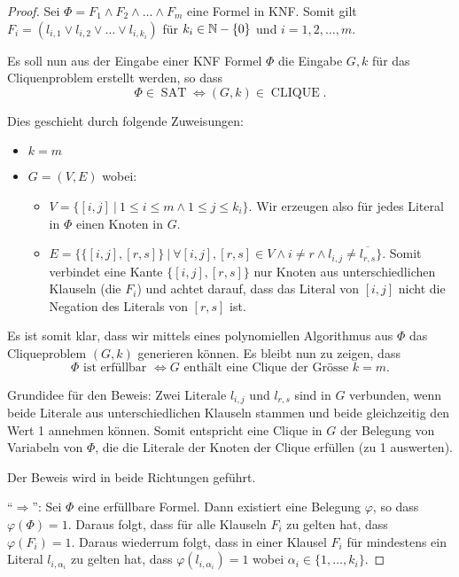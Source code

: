 \begin{proof}
Sei \(\Phi = F_1 \land F_2 \land \ldots \land F_m\) eine Formel in KNF. Somit gilt \(F_i = (l_{i, 1} \lor l_{i, 2} \lor \ldots \lor l_{i, k_i}) \) für \(k_i \in \mathbb{N} - \{0\}\) und \(i = 1, 2, \ldots, m\).

Es soll nun aus der Eingabe einer KNF Formel \(\Phi\) die Eingabe \(G, k\) für das Cliquenproblem erstellt werden, so dass
\[
\Phi \in \operatorname{SAT} \Leftrightarrow (G, k) \in \operatorname{CLIQUE}.
\]

Dies geschieht durch folgende Zuweisungen:
\begin{itemize}
  \item \(k = m\)
  \item \(G = (V, E)\) wobei:
  \begin{itemize}
    \item \(V = \{[i, j]\ |\ 1 \leq i \leq m \land 1 \leq j \leq k_i\}\). Wir erzeugen also für jedes Literal in \(\Phi\) einen Knoten in \(G\).
    \item \(E = \{ \{ [i, j], [r, s] \}\ |\ \forall [i,j], [r,s] \in V \land i \neq r \land l_{i,j} \neq \overline{l_{r, s}} \}\). Somit verbindet eine Kante \(\{[i, j], [r, s]\}\) nur Knoten aus unterschiedlichen Klauseln (die \(F_i\)) und achtet darauf, dass das Literal von \([i, j]\) nicht die Negation des Literals von \([r,s]\) ist.
  \end{itemize}
\end{itemize}

Es ist somit klar, dass wir mittels eines polynomiellen Algorithmus aus \(\Phi\) das Cliqueproblem \((G, k)\) generieren können. Es bleibt nun zu zeigen, dass 
\[
  \Phi \text{ ist erfüllbar } \Leftrightarrow G \text{ enthält eine Clique der Grösse } k = m.
\]

Grundidee für den Beweis: Zwei Literale \(l_{i,j}\) und \(l_{r, s}\) sind in \(G\) verbunden, wenn beide Literale aus unterschiedlichen Klauseln stammen und beide gleichzeitig den Wert 1 annehmen können. Somit entspricht eine Clique in \(G\) der Belegung von Variabeln von \(\Phi\), die die Literale der Knoten der Clique erfüllen (zu 1 auswerten).

Der Beweis wird in beide Richtungen geführt.

``\(\Rightarrow\)'': Sei \(\Phi\) eine erfüllbare Formel. Dann existiert eine Belegung \(\varphi\), so dass \(\varphi(\Phi) = 1\). Daraus folgt, dass für alle Klauseln \(F_i\) zu gelten hat, dass \(\varphi(F_i) = 1\). Daraus wiederrum folgt, dass in einer Klausel \(F_i\) für mindestens ein Literal \(l_{i, \alpha_i}\) zu gelten hat, dass \(\varphi(l_{i, \alpha_i}) = 1\) wobei \(\alpha_i \in \{1, \ldots, k_i\}\).


\end{proof}

